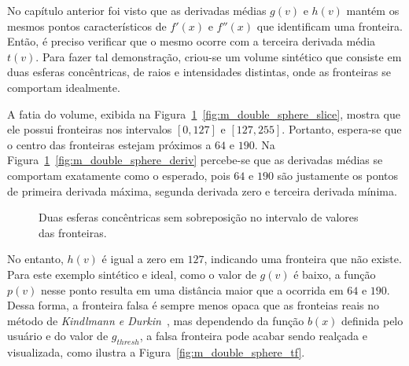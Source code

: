 	No capítulo anterior foi visto que as derivadas médias $ g(v) $ e $ h(v) $ mantém os mesmos pontos característicos de $ f'(x) $ e $ f''(x) $ que identificam uma fronteira. Então, é preciso verificar que o mesmo ocorre com a terceira derivada média $ t(v) $. Para fazer tal demonstração, criou-se um volume sintético que consiste em duas esferas concêntricas, de raios e intensidades distintas, onde as fronteiras se comportam idealmente.
	
	A fatia do volume, exibida na Figura~\ref{fig:m_double_sphere}~\ref{fig:m_double_sphere_slice}, mostra que ele possui fronteiras nos intervalos $ [0,127] $ e $ [127,255] $. Portanto, espera-se que o centro das fronteiras estejam próximos a $ 64 $ e $ 190 $. Na Figura~\ref{fig:m_double_sphere}~\ref{fig:m_double_sphere_deriv} percebe-se que as derivadas médias se comportam exatamente como o esperado, pois $ 64 $ e $ 190 $ são justamente os pontos de primeira derivada máxima, segunda derivada zero e terceira derivada mínima.
	
\begin{figure}[h]
	\centering
	\caption{Duas esferas concêntricas sem sobreposição no intervalo de valores das fronteiras.}
	\label{fig:m_double_sphere}
\end{figure}

	No entanto, $ h(v) $ é igual a zero em $ 127 $, indicando uma fronteira que não existe. Para este exemplo sintético e ideal, como o valor de $ g(v) $ é baixo, a função $ p(v) $ nesse ponto resulta em uma distância maior que a ocorrida em $ 64 $ e $ 190 $. Dessa forma, a fronteira falsa é sempre menos opaca que as fronteias reais no método de \textit{Kindlmann e Durkin}~\cite{gordon}, mas dependendo da função $ b(x) $ definida pelo usuário e do valor de $ g_{thresh} $, a falsa fronteira pode acabar sendo realçada e visualizada, como ilustra a Figura~\ref{fig:m_double_sphere_tf}.
	
